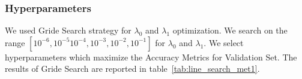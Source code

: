 \subsubsection{\label{seq:hyperparam}Hyperparameters}
We used Gride Search strategy for $\lambda_0$ and $\lambda_1$ optimization.
We search on the range 
$[10^{-6},10^{-5}10^{-4},10^{-3},10^{-2},10^{-1}]$ for $\lambda_0$ and $\lambda_1$.   
We select hyperparameters which maximize the Accuracy Metrics for Validation Set.
The results of Gride Search are reported in table~\ref{tab:line_search_met1}.
\begin{table}
\caption{\label{tab:line_search_met1}Best results of Line Search for the optimization of
hyperparameters for each dataset for the Unclustered Keywords method.}
\centering
{}
\end{table}
